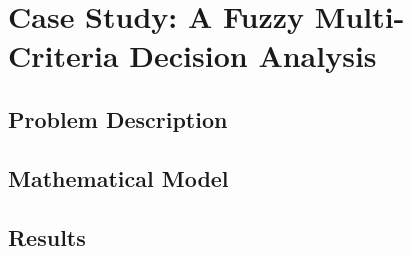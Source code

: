 \chapter{Case Study: A Fuzzy Multi-Criteria Decision Analysis}

\section{Problem Description}

\section{Mathematical Model}

\section{Results}